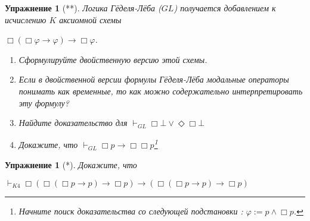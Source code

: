 \documentclass[11pt]{article}
\newtheorem{exercise}[theorem]{Упражнение}
\begin{document}
\begin{exercise}[**] Логика Гёделя-Лёба ($GL$) получается добавлением к исчислению $K$ аксиомной схемы 

\begin{center}
$\Box (\Box \varphi \to \varphi) \to \Box \varphi$.	
\end{center}

\begin{enumerate}
	\item Сформулируйте двойственную версию этой схемы.
    \item Если в двойственной версии формулы Гёделя-Лёба модальные операторы понимать как временные, то как можно содержательно интерпретировать эту формулу?
    \item Найдите доказательство для $\vdash_{GL} \Box \bot \vee \Diamond \Box \bot$
    \item Докажите, что  $\vdash_{GL} \Box p \to \Box \Box p$\footnote{Начните поиск доказательства со следующей подстановки : $\varphi:= p \wedge \Box p$.}
\end{enumerate}
\end{exercise}

\begin{exercise}[*] Докажите, что 
\begin{center}
    $\vdash_{K4} 
    \Box (\Box (\Box p \to p) \to \Box p) \to 
    (\Box (\Box p \to p) \to \Box p) $
\end{center}
\end{exercise}


\end{document}
